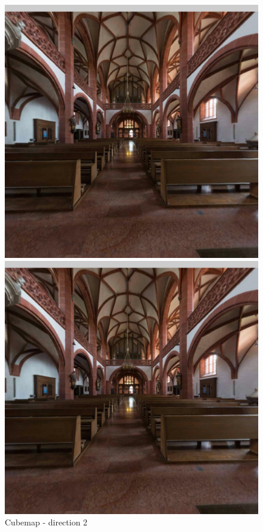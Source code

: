 \documentclass[12pt]{article}
\begin{document}
\begin{figure}[H]
  \centering
  \begin{minipage}[b]{0.3\textwidth}
    \includegraphics[width=1\textwidth]{../images/screenshots/Screenshot_5_Equi2Cube.jpg}
    \caption{Cubemap - direction 2}
    \label{fig:cubemap_direction_2}
  \end{minipage}
  \hfill
  \begin{minipage}[b]{0.3\textwidth}
    \centering
    \includegraphics[width=1\textwidth]{../images/screenshots/Screenshot_5_Skybox.jpg}

\end{minipage}
\end{figure}
\end{document}
